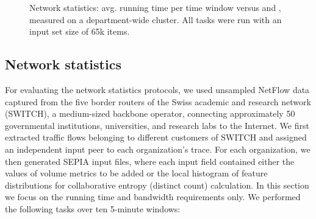 \documentclass[letterpaper,11pt,onecolumn,titlepage]{article}
\begin{document}
\begin{figure*}[t]
  \centering
	
	\caption{Network statistics: avg. running time per time window versus  and , measured on a department-wide cluster. 
	All tasks	were run with an input set size of 65k items.}
	\label{fig:statistics}
\end{figure*}


\subsection{Network statistics}
\label{sec:eval_stats}

For evaluating the network statistics protocols, we used unsampled NetFlow data captured from 
the five border routers of the Swiss academic and research network (SWITCH), 
a medium-sized backbone operator, connecting
approximately 50 governmental institutions, universities, and research
labs to the Internet. We first extracted traffic
flows belonging to different customers of SWITCH and assigned an independent input peer to each organization's trace. 
For each organization, we then generated SEPIA input files, where each input field contained either the values
of volume metrics to be added or the local histogram of feature
distributions for collaborative entropy (distinct
count) calculation. In this section we focus on the running time and bandwidth requirements only.
We performed the following tasks over ten 5-minute windows:
\end{document}
